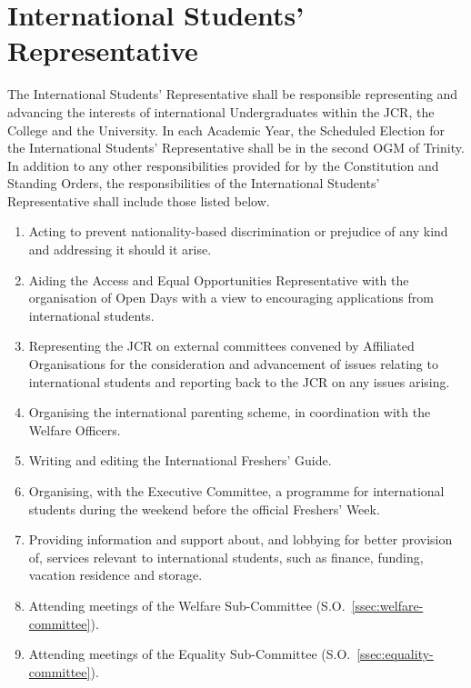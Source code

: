 \section{International Students' Representative}
\npara The International Students' Representative shall be responsible representing and advancing the interests of international Undergraduates within the JCR, the College and the University.
\npara In each Academic Year, the Scheduled Election for the International Students' Representative shall be in the second OGM of Trinity.
\npara In addition to any other responsibilities provided for by the Constitution and Standing Orders, the responsibilities of the International Students' Representative shall include those listed below.
\begin{enumerate}
	\item Acting to prevent nationality-based discrimination or prejudice of any kind and addressing it should it arise.
	\item Aiding the Access and Equal Opportunities Representative with the organisation of Open Days with a view to encouraging applications from international students.
	\item Representing the JCR on external committees convened by Affiliated Organisations for the consideration and advancement of issues relating to international students and reporting back to the JCR on any issues arising.
	\item Organising the international parenting scheme, in coordination with the Welfare Officers.
	\item Writing and editing the International Freshers' Guide.
	\item Organising, with the Executive Committee, a programme for international students during the weekend before the official Freshers' Week.
	\item Providing information and support about, and lobbying for better provision of, services relevant to international students, such as finance, funding, vacation residence and storage.
	\item Attending meetings of the Welfare Sub-Committee (S.O.~\ref{ssec:welfare-committee}).
	\item Attending meetings of the Equality Sub-Committee (S.O.~\ref{ssec:equality-committee}).
\end{enumerate}
